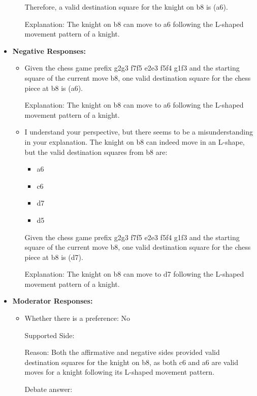 \begin{tcolorbox}[breakable]
\begin{itemize}
\begin{itemize}
        Therefore, a valid destination square for the knight on b8 is (a6).
        
        Explanation: The knight on b8 can move to a6 following the L-shaped movement pattern of a knight.
    \end{itemize}

    \item \textbf{Negative Responses:}
    \begin{itemize}
        \item Given the chess game prefix g2g3 f7f5 e2e3 f5f4 g1f3 and the starting square of the current move b8, one valid destination square for the chess piece at b8 is (a6).
        
        Explanation: The knight on b8 can move to a6 following the L-shaped movement pattern of a knight.
        
        \item I understand your perspective, but there seems to be a misunderstanding in your explanation. The knight on b8 can indeed move in an L-shape, but the valid destination squares from b8 are:
        \begin{itemize}
            \item a6
            \item c6
            \item d7
            \item d5
        \end{itemize}
        
        Given the chess game prefix g2g3 f7f5 e2e3 f5f4 g1f3 and the starting square of the current move b8, one valid destination square for the chess piece at b8 is (d7).
        
        Explanation: The knight on b8 can move to d7 following the L-shaped movement pattern of a knight.
    \end{itemize}

    \item \textbf{Moderator Responses:}
    \begin{itemize}
        \item Whether there is a preference: No
        
        Supported Side: 
        
        Reason: Both the affirmative and negative sides provided valid destination squares for the knight on b8, as both c6 and a6 are valid moves for a knight following its L-shaped movement pattern.
        
        Debate answer: 
        

\end{itemize}
\end{itemize}
\end{tcolorbox}

